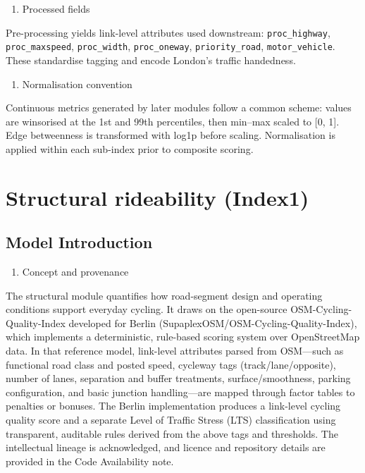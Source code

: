 \documentclass[
  12pt,
  oneside]{book}
\providecommand{\tightlist}{%
  \setlength{\itemsep}{0pt}\setlength{\parskip}{0pt}}
\begin{document}
\begin{enumerate}
\def\labelenumi{\arabic{enumi}.}
\setcounter{enumi}{2}
\tightlist
\item
  Processed fields
\end{enumerate}

Pre-processing yields link-level attributes used downstream: \texttt{proc\_highway}, \texttt{proc\_maxspeed}, \texttt{proc\_width}, \texttt{proc\_oneway}, \texttt{priority\_road}, \texttt{motor\_vehicle}. These standardise tagging and encode London's traffic handedness.

\begin{enumerate}
\def\labelenumi{\arabic{enumi}.}
\setcounter{enumi}{3}
\tightlist
\item
  Normalisation convention
\end{enumerate}

Continuous metrics generated by later modules follow a common scheme: values are winsorised at the 1st and 99th percentiles, then min--max scaled to {[}0, 1{]}. Edge betweenness is transformed with log1p before scaling. Normalisation is applied within each sub-index prior to composite scoring.

\section{Structural rideability (Index1)}\label{structural-rideability-index1}

\subsection{Model Introduction}\label{model-introduction}

\begin{enumerate}
\def\labelenumi{\arabic{enumi}.}
\tightlist
\item
  Concept and provenance
\end{enumerate}

The structural module quantifies how road-segment design and operating conditions support everyday cycling. It draws on the open-source OSM-Cycling-Quality-Index developed for Berlin (SupaplexOSM/OSM-Cycling-Quality-Index), which implements a deterministic, rule-based scoring system over OpenStreetMap data. In that reference model, link-level attributes parsed from OSM---such as functional road class and posted speed, cycleway tags (track/lane/opposite), number of lanes, separation and buffer treatments, surface/smoothness, parking configuration, and basic junction handling---are mapped through factor tables to penalties or bonuses. The Berlin implementation produces a link-level cycling quality score and a separate Level of Traffic Stress (LTS) classification using transparent, auditable rules derived from the above tags and thresholds. The intellectual lineage is acknowledged, and licence and repository details are provided in the Code Availability note.
\end{document}
